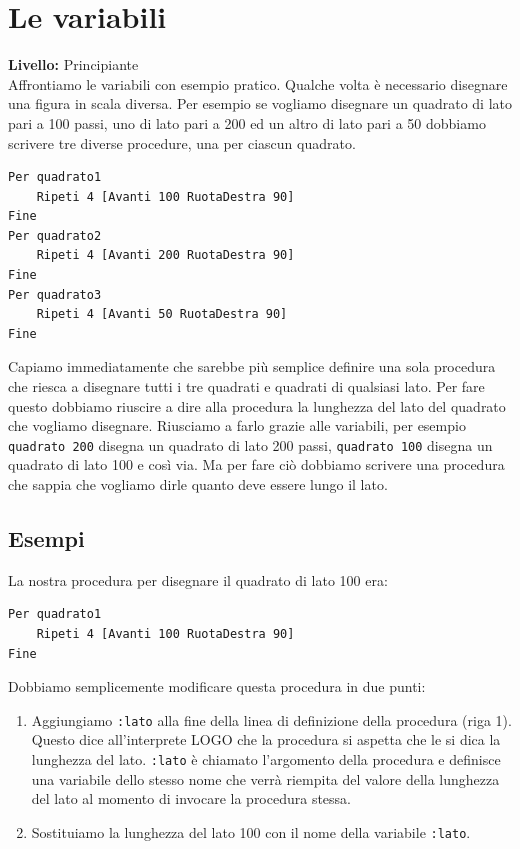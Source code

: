 \chapter{Le variabili}
{ }\hfill\textbf{Livello:} Principiante \\

Affrontiamo le variabili con esempio pratico. Qualche volta è necessario disegnare una figura in scala diversa. Per esempio se vogliamo disegnare un quadrato di lato pari a 100 passi, uno di lato pari a 200 ed un altro di lato pari a 50 dobbiamo scrivere tre diverse procedure, una per ciascun quadrato.

\begin{lstlisting}[caption="Il programma senza l'uso delle variabili"]
Per quadrato1
	Ripeti 4 [Avanti 100 RuotaDestra 90]
Fine
Per quadrato2
	Ripeti 4 [Avanti 200 RuotaDestra 90]
Fine
Per quadrato3
	Ripeti 4 [Avanti 50 RuotaDestra 90]
Fine
\end{lstlisting}

Capiamo immediatamente che sarebbe più semplice definire una sola procedura che riesca a disegnare tutti i tre quadrati e quadrati di qualsiasi lato. Per fare questo dobbiamo riuscire a dire alla procedura la lunghezza del lato del quadrato che vogliamo disegnare. Riusciamo a farlo grazie alle variabili, per esempio \texttt{quadrato 200} disegna un quadrato di lato 200 passi, \texttt{quadrato 100} disegna un quadrato di lato 100 e così via. Ma per fare ciò dobbiamo scrivere una procedura che sappia che vogliamo dirle quanto deve essere lungo il lato.



\section{Esempi}
\noindent La nostra procedura per disegnare il quadrato di lato 100 era:
\begin{lstlisting}
Per quadrato1
	Ripeti 4 [Avanti 100 RuotaDestra 90]
Fine
\end{lstlisting}  

Dobbiamo semplicemente modificare questa procedura in due punti:
\begin{enumerate}
	\item Aggiungiamo \texttt{:lato} alla fine della linea di definizione della procedura (riga 1). Questo dice all'interprete LOGO che la procedura si aspetta che le si dica la lunghezza del lato. \texttt{:lato} è chiamato l'argomento della procedura e definisce una variabile dello stesso nome che verrà riempita del valore della lunghezza del lato al momento di invocare la procedura stessa. 
	\item Sostituiamo la lunghezza del lato 100 con il nome della variabile \texttt{:lato}.
\end{enumerate}

